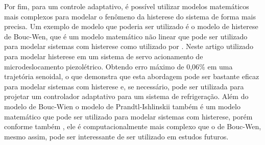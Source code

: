 Por fim, para um controle adaptativo, é possível utilizar modelos matemáticos mais complexos para modelar o fenômeno da histerese do sistema de forma mais precisa. Um exemplo de modelo que poderia ser utilizado é o modelo de histerese de Bouc-Wen, que é um modelo matemático não linear que pode ser utilizado para modelar sistemas com histerese como utilizado por \textcite{ZHANG2024112387}. Neste artigo utilizado para modelar histerese em um sistema de servo acionamento de microdeslocamento piezolétrico. Obtendo erro máximo de 0,06\% em uma trajetória senoidal, o que demonstra que esta abordagem pode ser bastante eficaz para modelar sistemas com histerese e, se necessário, pode ser utilizada para projetar um controlador adaptativo para um sistema de refrigeração. Além do modelo de Bouc-Wien o modelo de Prandtl-Ishlinskii também é um modelo matemático que pode ser utilizado para modelar sistemas com histerese, porém conforme também \textcite{ZHANG2024112387}, ele é computacionalmente mais complexo que o de Bouc-Wen, mesmo assim, pode ser interessante de ser utilizado em estudos futuros.





